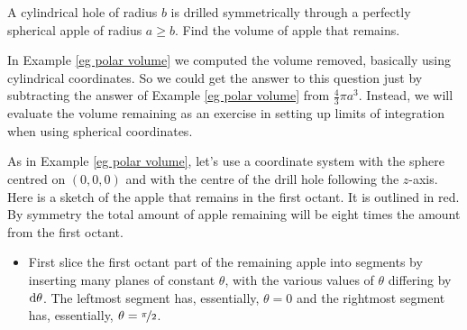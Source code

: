 \begin{eg}\label{eg cored apple}
A cylindrical hole of radius $b$ is drilled symmetrically through a
perfectly spherical apple of radius $a\ge b$. Find the volume of apple that
remains.

\soln
In Example \ref{eg polar volume} we computed the volume removed, basically using cylindrical coordinates. So we could get the answer to this question 
just by subtracting the answer of Example \ref{eg polar volume} from 
$\frac{4}{3}\pi a^3$. Instead, we will evaluate the volume remaining
as an exercise in setting up limits of integration when 
using spherical coordinates.

As in Example \ref{eg polar volume}, let's use a coordinate system 
with the sphere centred on $(0,0,0)$ and with the centre of the drill 
hole following the $z$-axis. Here is a sketch of the apple that remains
in the first octant. It is outlined in red. By symmetry
the total amount of apple remaining will be eight times the amount
from the first octant.

\begin{itemize}
\item
First slice the first octant part of the remaining apple into segments
by inserting many planes of constant $\theta$, with the various values of 
$\theta$ differing by $\mathrm{d}\theta$. The leftmost segment has, essentially, $\theta=0$ and the rightmost segment has, essentially, $\theta=\nicefrac{\pi}{2}$.


\end{itemize}
\end{eg}
